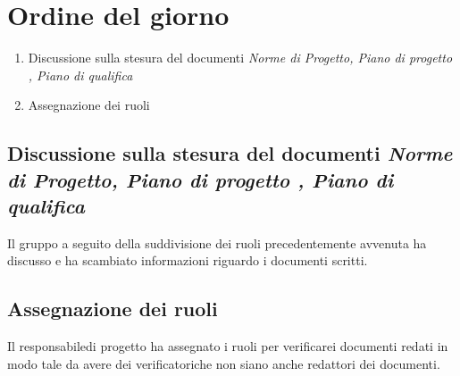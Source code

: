 \section{Ordine del giorno}
\begin{enumerate}
\item Discussione sulla stesura del documenti \textit{Norme di Progetto, Piano di progetto , Piano di qualifica} 
\item Assegnazione dei ruoli 
\end{enumerate}

\subsection{Discussione sulla stesura del documenti \textit{Norme di Progetto, Piano di progetto , Piano di qualifica} }
Il gruppo a seguito della suddivisione dei ruoli precedentemente avvenuta ha discusso e ha scambiato informazioni riguardo i documenti scritti. 

\subsection{Assegnazione dei ruoli}
Il responsabile\glo di progetto ha assegnato i ruoli per verificare\glo i documenti redati in modo tale da avere dei verificatori\glo che non siano anche redattori dei documenti.

